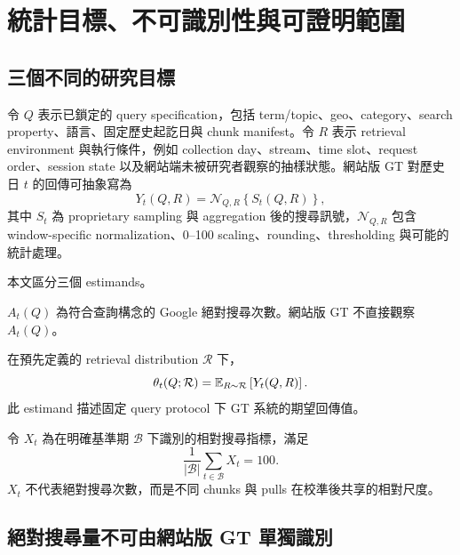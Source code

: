 \documentclass[12pt,a4paper,oneside]{article}
\begin{document}
\section{統計目標、不可識別性與可證明範圍}

\subsection{三個不同的研究目標}

令 $Q$ 表示已鎖定的 query specification，包括 term/topic、geo、category、search property、語言、固定歷史起訖日與 chunk manifest。令 $R$ 表示 retrieval environment 與執行條件，例如 collection day、stream、time slot、request order、session state 以及網站端未被研究者觀察的抽樣狀態。網站版 GT 對歷史日 $t$ 的回傳可抽象寫為
\begin{equation}
Y_t(Q,R)=\mathcal{N}_{Q,R}\!\left\{S_t(Q,R)\right\},
\label{eq:gtabstract}
\end{equation}
其中 $S_t$ 為 proprietary sampling 與 aggregation 後的搜尋訊號，$\mathcal{N}_{Q,R}$ 包含 window-specific normalization、0--100 scaling、rounding、thresholding 與可能的統計處理。

本文區分三個 estimands。

\begin{definition}[絕對搜尋量]
$A_t(Q)$ 為符合查詢構念的 Google 絕對搜尋次數。網站版 GT 不直接觀察 $A_t(Q)$。
\end{definition}

\begin{definition}[GT 設計期望]
在預先定義的 retrieval distribution $\mathcal{R}$ 下，
\begin{equation}
\theta_t(Q;\mathcal{R})
=\mathbb{E}_{R\sim\mathcal{R}}\left[Y_t(Q,R)\right].
\label{eq:designestimand}
\end{equation}
此 estimand 描述固定 query protocol 下 GT 系統的期望回傳值。
\end{definition}

\begin{definition}[共同尺度潛在相對訊號]
令 $X_t$ 為在明確基準期 $\mathcal{B}$ 下識別的相對搜尋指標，滿足
\begin{equation}
\frac{1}{|\mathcal{B}|}\sum_{t\in\mathcal{B}}X_t=100.
\label{eq:baselineidentification}
\end{equation}
$X_t$ 不代表絕對搜尋次數，而是不同 chunks 與 pulls 在校準後共享的相對尺度。
\end{definition}

\subsection{絕對搜尋量不可由網站版 GT 單獨識別}
\end{document}
